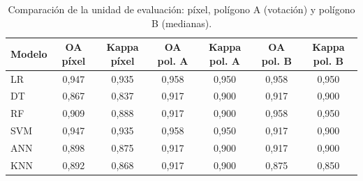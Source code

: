 \begin{table}[htbp]
 \centering
 \small
 \caption{Comparación de la unidad de evaluación: píxel, polígono A (votación) y polígono B (medianas).}
 \label{tab:pixel_vs_poligono}
 \begin{tabular}{lcccccc}
  \toprule
  Modelo & OA píxel & Kappa píxel & OA pol. A & Kappa pol. A & OA pol. B & Kappa pol. B \\
  \midrule
  LR & 0{,}947 & 0{,}935 & 0{,}958 & 0{,}950 & 0{,}958 & 0{,}950 \\
  DT & 0{,}867 & 0{,}837 & 0{,}917 & 0{,}900 & 0{,}917 & 0{,}900 \\
  RF & 0{,}909 & 0{,}888 & 0{,}917 & 0{,}900 & 0{,}958 & 0{,}950 \\
  SVM & 0{,}947 & 0{,}935 & 0{,}958 & 0{,}950 & 0{,}917 & 0{,}900 \\
  ANN & 0{,}898 & 0{,}875 & 0{,}917 & 0{,}900 & 0{,}917 & 0{,}900 \\
  KNN & 0{,}892 & 0{,}868 & 0{,}917 & 0{,}900 & 0{,}875 & 0{,}850 \\
  \bottomrule
 \end{tabular}
\end{table}
